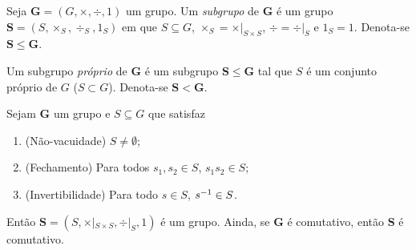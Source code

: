 \begin{definition}
Seja $\bm G = (G,\times,\div,1)$ um grupo. Um \emph{subgrupo} de $\bm G$ é um grupo $\bm S=(S,\times_S,\div_S,1_S)$ em que $S \subseteq G$, $\times_S=\times|_{S \times S}$, $\div = \div|_S$ e $1_S=1$. Denota-se $\bm S \leq \bm G$.

Um subgrupo \emph{próprio} de $\bm G$ é um subgrupo $\bm S \leq \bm G$ tal que $S$ é um conjunto próprio de $G$ ($S  \subset G$). Denota-se $\bm S < \bm G$.
\end{definition}

\begin{proposition}
\label{alge:prop.subgru}
Sejam $\bm G$ um grupo e $S \subseteq G$ que satisfaz
	\begin{enumerate}[label=\textbf{SG\arabic*.},ref={SG\arabic*}]
	\item \label{SG1} (Não-vacuidade) $S \neq \emptyset$;
	\item \label{SG2} (Fechamento) Para todos $s_1,s_2 \in S$, $s_1s_2 \in S$;
	\item \label{SG3} (Invertibilidade) Para todo $s \in S$,  $s^{-1} \in S$.
	\end{enumerate}	
\noindent
Então $\bm S=(S,\times|_{S \times S}, \div|_S,1)$ é um grupo. Ainda, se $\bm G$ é comutativo, então $\bm S$ é comutativo.
\end{proposition}
